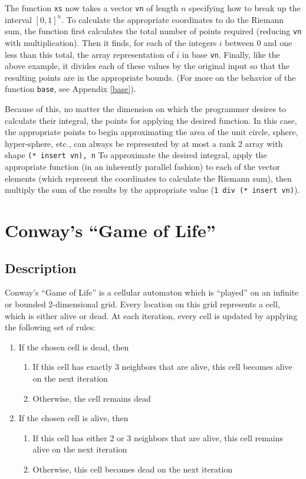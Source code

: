The function \texttt{xs} now takes a vector \texttt{vn} of length $n$ 
specifying how to break up the interval $[0,1]^n$.
To calculate the appropriate coordinates to do the Riemann sum, 
the function first calculates the total number of points required (reducing \texttt{vn} with multiplication). 
Then it finds, for each of the integers $i$ between 0 and one less than this total, 
the array representation of $i$ in base \texttt{vn}. 
Finally, like the above example, it divides each of these values by the original input 
so that the resulting points are in the appropriate bounds.
(For more on the behavior of the function \texttt{base}, see Appendix \ref{base}). %

Because of this, no matter the dimension on which the programmer desires to calculate their integral, 
the points for applying the desired function.
In this case, the appropriate points to begin approximating the area of the unit circle, sphere, hyper-sphere, etc.,
can always be represented by at most a rank 2 array with shape \texttt{(* insert vn), n}
To approximate the desired integral, apply the appropriate function (in an inherently parallel fashion) 
to each of the vector elements (which represent the coordinates to calculate the Riemann sum), 
then multiply the sum of the results by the appropriate value (\texttt{1 div (* insert vn)}).

\section{Conway's ``Game of Life''}
\subsection{Description}
Conway's ``Game of Life''\cite{gol} is a cellular automaton which is ``played'' on an infinite or bounded 2-dimensional grid. 
Every location on this grid represents a cell, which is either alive or dead. 
At each iteration, every cell is updated by applying the following set of rules:

\begin{enumerate}
	\item If the chosen cell is dead, then
	\begin{enumerate}
		\item If this cell has exactly 3 neighbors that are alive, 
			this cell becomes alive on the next iteration
		\item Otherwise, the cell remains dead
	\end{enumerate}
	\item If the chosen cell is alive, then
	\begin{enumerate}
		\item If this cell has either 2 or 3 neighbors that are alive, 
			this cell remains alive on the next iteration
		\item Otherwise, this cell becomes dead on the next iteration
	\end{enumerate}
\end{enumerate}

